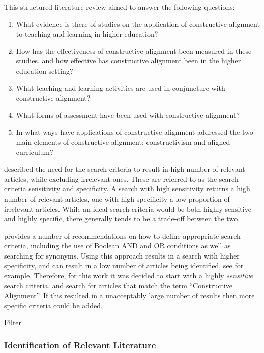 This structured literature review aimed to answer the following questions:

\begin{enumerate}
	\item What evidence is there of studies on the application of constructive alignment to teaching and learning in higher education?
	\item How has the effectiveness of constructive alignment been measured in these studies, and how effective has constructive alignment been in the higher education setting?
	\item What teaching and learning activities are used in conjuncture with constructive alignment?
	\item What forms of assessment have been used with constructive alignment?
	\item In what ways have applications of constructive alignment addressed the two main elements of constructive alignment: constructivism and aligned curriculum?
\end{enumerate}

\citet{Petticrew:2008} described the need for the search criteria to result in high number of relevant articles, while excluding irrelevant ones. These are referred to as the search criteria sensitivity and specificity. A search with high sensitivity returns a high number of relevant articles, one with high specificity a low proportion of irrelevant articles. While an ideal search criteria would be both highly sensitive and highly specific, there generally tends to be a trade-off between the two. 

\citet{Kitchenham:2004} provides a number of recommendations on how to define appropriate search criteria, including the use of Boolean AND and OR conditions as well as searching for synonyms. Using this approach results in a search with higher specificity, and can result in a low number of articles being identified, see \citet{Salleh:2011} for example. Therefore, for this work it was decided to start with a highly \emph{sensitive} search criteria, and search for articles that match the term ``Constructive Alignment''. If this resulted in a unacceptably large number of results then more specific criteria could be added.

Filter


\subsubsection{Identification of Relevant Literature} %
\label{ssub:identification_of_relevant_literature}






